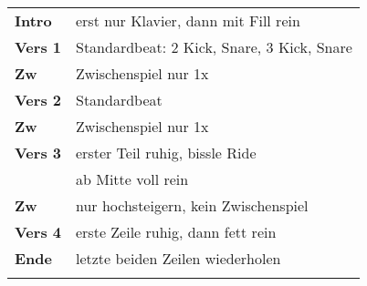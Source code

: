 \begin{tabular}{p{1.6cm}l}
	\textbf{Intro} & erst nur Klavier, dann mit Fill rein \\
	\textbf{Vers 1} & Standardbeat: 2 Kick, Snare, 3 Kick, Snare                                                          \\
	\textbf{Zw}     & Zwischenspiel nur 1x \\
	\textbf{Vers 2} & Standardbeat                                                          \\
	\textbf{Zw}     & Zwischenspiel nur 1x  \\
	\textbf{Vers 3} & erster Teil ruhig, bissle Ride \\
	& ab Mitte voll rein                                                          \\
	\textbf{Zw}     & nur hochsteigern, kein Zwischenspiel     \\
	\textbf{Vers 4} & erste Zeile ruhig, dann fett rein                                                          \\
	\textbf{Ende} & letzte beiden Zeilen wiederholen \\
	&                                                                  \\
\end{tabular}
